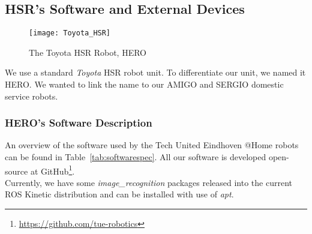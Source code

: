 \subsection{HSR's Software and External Devices}

\setlength\intextsep{0pt}
\begin{wrapfigure}[5]{r}{0.3\textwidth}
	\centering
	\texttt{[image: Toyota\_HSR]}
	\caption{The Toyota HSR Robot, HERO}
	\label{fig:hsr}
\end{wrapfigure}

We use a standard \textit{Toyota} HSR robot unit. To differentiate our unit, we named it HERO. We wanted to link the name to our AMIGO and SERGIO domestic service robots.

\subsubsection{HERO's Software Description}

An overview of the software used by the Tech United Eindhoven @Home robots can be found in Table~\ref{tab:softwarespec}.
All our software is developed open-source at GitHub\footnote{\url{https://github.com/tue-robotics}}.
\\\newline
Currently, we have some \textit{image\_recognition} packages released into the current ROS Kinetic distribution and can be installed with use of \textit{apt}.

